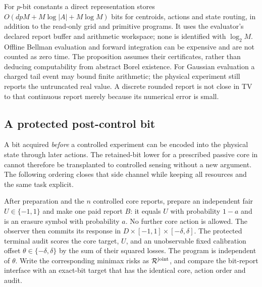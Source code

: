 For $p$-bit constants a direct representation stores $O(dpM+M\log|A|+M\log M)$ bits for centroids, actions and state routing, in addition to the read-only grid and primitive programs. It uses the evaluator's declared report buffer and arithmetic workspace; none is identified with $\log_2M$. Offline Bellman evaluation and forward integration can be expensive and are not counted as zero time. The proposition assumes their certificates, rather than deducing computability from abstract Borel existence. For Gaussian evaluation a charged tail event may bound finite arithmetic; the physical experiment still reports the untruncated real value. A discrete rounded report is not close in TV to that continuous report merely because its numerical error is small.

\subsection{A protected post-control bit}
A bit acquired \emph{before} a controlled experiment can be encoded into the physical state through later actions. The retained-bit lower for a prescribed passive core in \cite{GTFBayes} cannot therefore be transplanted to controlled sensing without a new argument. The following ordering closes that side channel while keeping all resources and the same task explicit.

After preparation and the $n$ controlled core reports, prepare an independent fair $U\in\{-1,1\}$ and make one paid report $B$: it equals $U$ with probability $1-a$ and is an erasure symbol with probability $a$. No further core action is allowed. The observer then commits its response in $D\times[-1,1]\times[-\delta,\delta]$. The protected terminal audit scores the core target, $U$, and an unobservable fixed calibration offset $\theta\in\{-\delta,\delta\}$ by the sum of their squared losses. The program is independent of $\theta$. Write the corresponding minimax risks as $\mathcal R^{\rm joint}$, and compare the bit-report interface with an exact-bit target that has the identical core, action order and audit.

